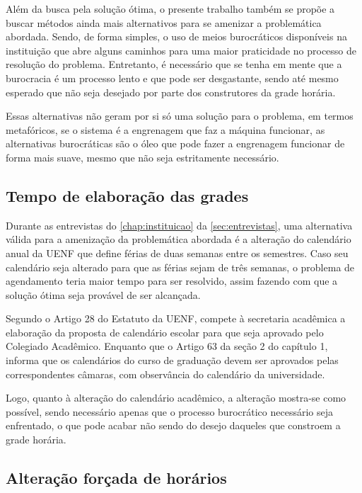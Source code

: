 Além da busca pela solução ótima, o presente trabalho também se propõe a buscar métodos ainda mais alternativos para se amenizar a problemática abordada. Sendo, de forma simples, o uso de meios burocráticos disponíveis na instituição que abre alguns caminhos para uma maior praticidade no processo de resolução do problema. Entretanto, é necessário que se tenha em mente que a burocracia é um processo lento e que pode ser desgastante, sendo até mesmo esperado que não seja desejado por parte dos construtores da grade horária.

Essas alternativas não geram por si só uma solução para o problema, em termos metafóricos, se o sistema é a engrenagem que faz a máquina funcionar, as alternativas burocráticas são o óleo que pode fazer a engrenagem funcionar de forma mais suave, mesmo que não seja estritamente necessário.

\subsection{Tempo de elaboração das grades} \label{ssec:burocracia-férias} %

Durante as entrevistas do \autoref{chap:instituicao} da \autoref{sec:entrevistas}, uma alternativa válida para a amenização da problemática abordada é a alteração do calendário anual da UENF que define férias de duas semanas entre os semestres. Caso seu calendário seja alterado para que as férias sejam de três semanas, o problema de agendamento teria maior tempo para ser resolvido, assim fazendo com que a solução ótima seja provável de ser alcançada.


Segundo o Artigo 28 do Estatuto da UENF, compete à secretaria acadêmica a elaboração da proposta de calendário escolar para que seja aprovado pelo Colegiado Acadêmico. Enquanto que o Artigo 63 da seção 2 do capítulo 1, informa que os calendários do curso de graduação devem ser aprovados pelas correspondentes câmaras, com observância do calendário da universidade.

Logo, quanto à alteração do calendário acadêmico, a alteração mostra-se como possível, sendo necessário apenas que o processo burocrático necessário seja enfrentado, o que pode acabar não sendo do desejo daqueles que constroem a grade horária.

\subsection{Alteração forçada de horários} \label{ssec:burocracia-troca} %

